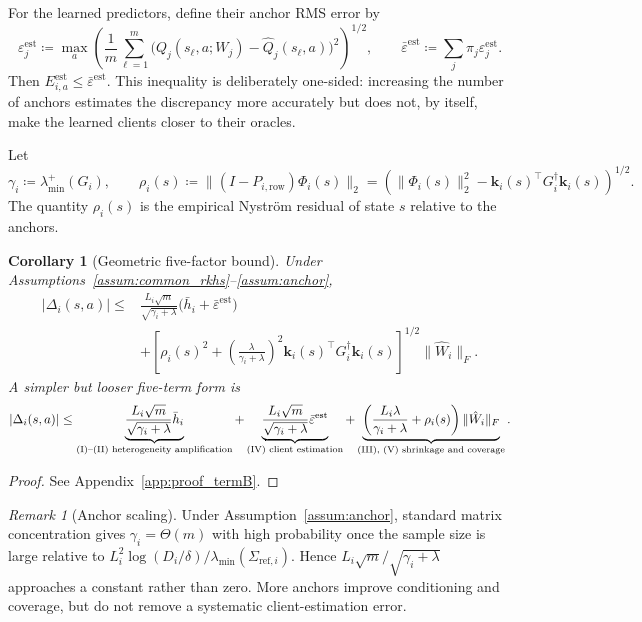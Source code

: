 \documentclass[sigconf,anonymous]{aamas}
\theoremstyle{plain}
\newtheorem{corollary}{Corollary}
\theoremstyle{definition}
\theoremstyle{remark}
\newtheorem{remark}{Remark}
\newcommand{\defeq}{\coloneqq}
\begin{document}
For the learned predictors, define their anchor RMS error by
\[
\varepsilon_j^{\mathrm{est}}
\defeq
\max_a
\left(
\frac1m\sum_{\ell=1}^m
\bigl(Q_j(s_\ell,a;W_j)-\hat Q_j(s_\ell,a)\bigr)^2
\right)^{1/2},
\qquad
\bar\varepsilon^{\mathrm{est}}
\defeq
\sum_j\pi_j\varepsilon_j^{\mathrm{est}}.
\]
Then $E_{i,a}^{\mathrm{est}}\le\bar\varepsilon^{\mathrm{est}}$.
This inequality is deliberately one-sided: increasing the number of
anchors estimates the discrepancy more accurately but does not, by
itself, make the learned clients closer to their oracles.

Let
\[
\gamma_i\defeq\lambda_{\min}^+(G_i),\qquad
\rho_i(s)
\defeq
\|(I-P_{i,\mathrm{row}})\Phi_i(s)\|_2
=
\left(
\|\Phi_i(s)\|_2^2-
\mathbf k_i(s)^\top G_i^\dagger\mathbf k_i(s)
\right)^{1/2}.
\]
The quantity $\rho_i(s)$ is the empirical Nystr\"om residual of state
$s$ relative to the anchors.

\begin{corollary}[Geometric five-factor bound]
\label{cor:geometric_gap}
Under Assumptions~\ref{assum:common_rkhs}--\ref{assum:anchor},
\begin{align}
|\Delta_i(s,a)|
\le{}&
\frac{L_i\sqrt m}{\sqrt{\gamma_i+\lambda}}
\bigl(\bar h_i+\bar\varepsilon^{\mathrm{est}}\bigr)
\nonumber\\
&+
\left[
\rho_i(s)^2+
\left(\frac{\lambda}{\gamma_i+\lambda}\right)^2
\mathbf k_i(s)^\top G_i^\dagger\mathbf k_i(s)
\right]^{1/2}
\|\hat W_i\|_F .
\label{eq:fed_gap_bound}
\end{align}
A simpler but looser five-term form is
\begin{equation}
|\Delta_i(s,a)|
\le
\underbrace{
\frac{L_i\sqrt m}{\sqrt{\gamma_i+\lambda}}\bar h_i
}_{\textup{(I)--(II) heterogeneity amplification}}
+
\underbrace{
\frac{L_i\sqrt m}{\sqrt{\gamma_i+\lambda}}
\bar\varepsilon^{\mathrm{est}}
}_{\textup{(IV) client estimation}}
+
\underbrace{
\left(
\frac{L_i\lambda}{\gamma_i+\lambda}+\rho_i(s)
\right)\|\hat W_i\|_F
}_{\textup{(III), (V) shrinkage and coverage}} .
\label{eq:fed_gap_five_term}
\end{equation}
\end{corollary}

\begin{proof}
See Appendix~\ref{app:proof_termB}.
\end{proof}

\begin{remark}[Anchor scaling]
\label{rem:m_scaling}
Under Assumption~\ref{assum:anchor}, standard matrix concentration gives
$\gamma_i=\Theta(m)$ with high probability once the sample size is large
relative to
$L_i^2\log(D_i/\delta)/
\lambda_{\min}(\Sigma_{\mathrm{ref},i})$.
Hence $L_i\sqrt m/\sqrt{\gamma_i+\lambda}$ approaches a constant rather
than zero.  More anchors improve conditioning and coverage, but do not
remove a systematic client-estimation error.
\end{remark}
\end{document}
